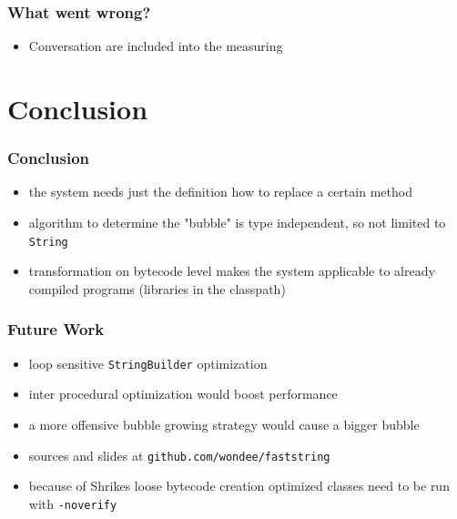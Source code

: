 \documentclass{beamer}
\begin{document}
\begin{frame}
	\frametitle{What went wrong?}

  \begin{itemize}
    \item Conversation are included into the measuring
  
  \end{itemize}

\end{frame}

\section{Conclusion}

\frame{\sectionpage}

\begin{frame}
	\frametitle{Conclusion}
	\begin{itemize}
    \item the system needs just the definition how to replace a certain method
		\item algorithm to determine the "bubble" is type independent, so not limited to \texttt{String}
		\item transformation on bytecode level makes the system applicable to already compiled programs (libraries in the classpath) 
	\end{itemize}
\end{frame}

\begin{frame}
	\frametitle{Future Work}
  \begin{itemize}
    \item loop sensitive \texttt{StringBuilder} optimization 
    \item inter procedural optimization would boost performance 
    \item a more offensive bubble growing strategy would cause a bigger bubble
    \item sources and slides at \texttt{github.com/wondee/faststring}
    \item because of Shrikes loose bytecode creation optimized classes need to be run with \texttt{-noverify}
  \end{itemize}
\end{frame}
\end{document}
